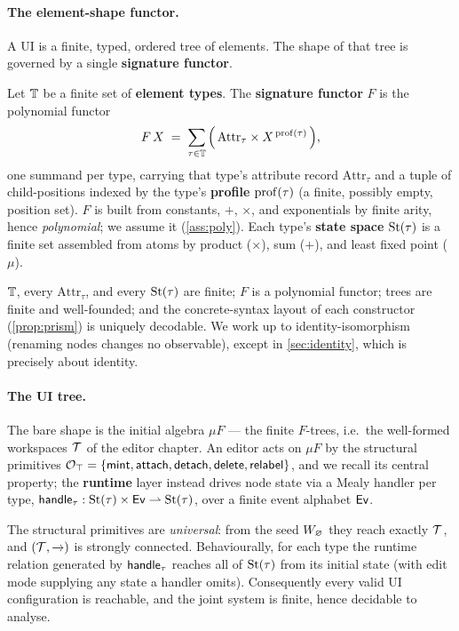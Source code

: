 \documentclass[../uxoxo-main]{subfiles}
\begin{document}
\paragraph{The element-shape functor.}
A UI is a finite, typed, ordered tree of elements. The shape of that tree is
governed by a single \textbf{signature functor}.

\begin{definition}[Signature]\label{def:sig}
Let $\mathbb{T}$ be a finite set of \textbf{element types}. The \textbf{signature
functor} $F$ is the polynomial functor
\[
  F\,X \;=\; \sum_{\tau\in\mathbb{T}} \Big(\,\mathrm{Attr}_\tau \times X^{\,\mathrm{prof}(\tau)}\,\Big),
\]
one summand per type, carrying that type's attribute record $\mathrm{Attr}_\tau$
and a tuple of child-positions indexed by the type's \textbf{profile}
$\mathrm{prof}(\tau)$ (a finite, possibly empty, position set). $F$ is built from
constants, $+$, $\times$, and exponentials by finite arity, hence
\emph{polynomial}; we assume it  (\cref{ass:poly}). Each
type's \textbf{state space} $\mathrm{St}(\tau)$ is a finite set assembled from atoms by
product ($\times$), sum ($+$), and least fixed point ($\mu$).
\end{definition}

\begin{assumption}\label{ass:poly}
$\mathbb{T}$, every $\mathrm{Attr}_\tau$, and every $\mathrm{St}(\tau)$ are finite; $F$ is a
polynomial  functor; trees are finite and well-founded; and the
concrete-syntax layout of each constructor (\cref{prop:prism}) is uniquely
decodable. We work up to identity-isomorphism (renaming nodes changes no
observable), except in \cref{sec:identity}, which is precisely about identity.
\end{assumption}

\paragraph{The UI tree.}
The bare shape is the initial algebra $\mu F$ --- the finite $F$-trees, i.e.\ the
well-formed workspaces $\mathcal{T}$ of the editor chapter. An editor acts on $\mu F$
by the structural primitives
$\mathcal{O}_\top=\{\mathsf{mint},\mathsf{attach},\mathsf{detach},\mathsf{delete},\mathsf{relabel}\}$, and we recall its central
property; the \textbf{runtime} layer instead drives node state via a Mealy
handler per type, $\mathsf{handle}_\tau:\mathrm{St}(\tau)\times\mathsf{Ev}\rightharpoonup\mathrm{St}(\tau)$, over a finite
event alphabet $\mathsf{Ev}$.

\begin{theorem}\label{thm:gc}
The structural primitives are \emph{universal}: from the seed $W_{\varnothing}$ they reach
exactly $\mathcal{T}$, and $(\mathcal{T},\xrightarrow{\,\,})$ is strongly connected. Behaviourally, for
each type the runtime relation generated by $\mathsf{handle}_\tau$ reaches all of
$\mathrm{St}(\tau)$ from its initial state (with edit mode supplying any state a handler
omits). Consequently every valid UI configuration is reachable, and the joint
system is finite, hence decidable to analyse.
\end{theorem}
\end{document}

